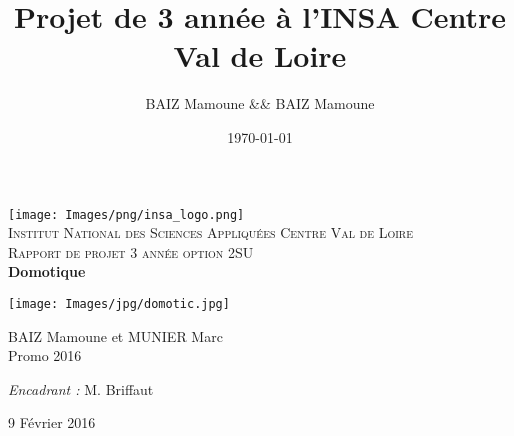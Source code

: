 



\title{ Projet de 3 année à l'INSA Centre Val de Loire } %
\author{BAIZ Mamoune && BAIZ Mamoune} %
\date{\today} %


{
\begin{titlepage}
  \begin{sffamily}
  \begin{center}

    \texttt{[image: Images/png/insa\_logo.png]}~\\[1.5cm]

    \textsc{\LARGE Institut National des Sciences Appliquées  Centre Val de Loire }\\[2cm]

    \textsc{\Large Rapport de projet 3 année option 2SU}\\[1.5cm]

    { \huge \bfseries Domotique\\[0.4cm] }

    \texttt{[image: Images/jpg/domotic.jpg]}
    \\[2cm]

    \begin{minipage}{0.4\textwidth}
      \begin{flushleft} \large
        BAIZ Mamoune et MUNIER Marc \\
        Promo 2016\\
      \end{flushleft}
    \end{minipage}
    \begin{minipage}{0.4\textwidth}
      \begin{flushright} \large
        \emph{Encadrant :} M. Briffaut\\
      \end{flushright}
    \end{minipage}

    \vfill

    {\large 9 Février 2016}

  \end{center}
  \end{sffamily}
\end{titlepage}
}
\newpage



